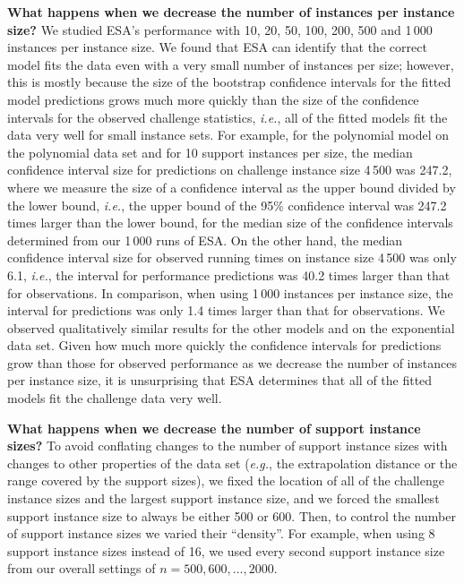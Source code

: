 \documentclass[aic]{iosart2x}
\newcommand{\eg}{\emph{e.g.}}
\newcommand{\ie}{\emph{i.e.}}
\begin{document}
\textbf{What happens when we decrease the number of instances per instance size?}
We studied ESA's performance with 10, 20, 50, 100, 200, 500 and 1\,000 instances per instance size.
We found that ESA can identify that the correct model fits the data even with a very small number of instances per size; however, this is mostly because the size of the bootstrap confidence intervals for the fitted model predictions grows much more quickly than the size of the confidence intervals for the observed challenge statistics, \ie{}, all of the fitted models fit the data very well for small instance sets. 
For example, for the polynomial model on the polynomial data set and for 10 support instances per size, the median confidence interval size for predictions on challenge instance size 4\,500 was 247.2, where we measure the size of a confidence interval as the upper bound divided by the lower bound, \ie{}, the upper bound of the 95\% confidence interval was 247.2 times larger than the lower bound, for the median size of the confidence intervals determined  from our 1\,000 runs of ESA. 
On the other hand, the median confidence interval size for observed running times on instance size 4\,500 was only 6.1, \ie{}, the interval for performance predictions was 40.2 times larger than that for observations.
In comparison, when using 1\,000 instances per instance size, the interval for predictions was only 1.4 times larger than that for observations. 
We observed qualitatively similar results for the other models and on the exponential data set. 
Given how much more quickly the confidence intervals for predictions grow than those for observed performance as we decrease the number of instances per instance size, it is unsurprising that ESA determines that all of the fitted models fit the challenge data very well.

\textbf{What happens when we decrease the number of support instance sizes?}
To avoid conflating changes to the number of support instance sizes with changes to other properties of the data set (\eg{}, the extrapolation distance or the range covered by the support sizes), we fixed the location of all of the challenge instance sizes and the largest support instance size, and we forced the smallest support instance size to always be either 500 or 600. 
Then, to control the number of support instance sizes we varied their ``density''. 
For example, when using 8 support instance sizes instead of 16, we used every second support instance size from our overall settings of $n=500, 600, ..., 2000$.
\end{document}
